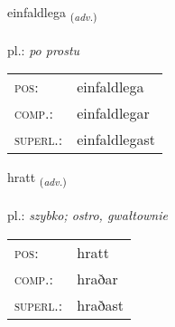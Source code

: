 \documentclass[frontgrid, backgrid]{flacards}\usepackage[]{graphicx}\usepackage[]{xcolor}
\begin{document}
\renewcommand{\flhead}{\vskip5pt \fboxsep=0pt {\small\bfseries\footnotesize Atviksorð | przysłówek}}
\renewcommand{\fcfoot}{\vskip5pt \fboxsep=0pt \hspace{2pt}{\small\bfseries\footnotesize 1K}}

\renewcommand{\blhead}{\vskip5pt {\small\bfseries\footnotesize Atviksorð | przysłówek }}
\renewcommand{\bcfoot}{\vskip5pt \hspace{2pt}{\small\bfseries\footnotesize 1K}}


{einfaldlega \small{\textsubscript{(\textit{adv.})}} \\[1ex] %
\textphonetic{[einfaltlɛɣa]} \\
pl.: \emph{po prostu} \\  [2ex]
\renewcommand*{\arraystretch}{0.8}
\begin{tabular}{ll}
\textsc{pos}: & einfaldlega \\ 
\textsc{comp.}: & einfaldlegar \\ 
\textsc{superl.}: & einfaldlegast \\
\end{tabular}
}

\renewcommand{\flhead}{\vskip5pt \fboxsep=0pt {\small\bfseries\footnotesize Atviksorð | przysłówek}}
\renewcommand{\fcfoot}{\vskip5pt \fboxsep=0pt \hspace{2pt}{\small\bfseries\footnotesize 1K}}

\renewcommand{\blhead}{\vskip5pt {\small\bfseries\footnotesize Atviksorð | przysłówek }}
\renewcommand{\bcfoot}{\vskip5pt \hspace{2pt}{\small\bfseries\footnotesize 1K}}


{hratt \small{\textsubscript{(\textit{adv.})}} \\[1ex] %
\textphonetic{[r̥aht]} \\
pl.: \emph{szybko; ostro, gwałtownie} \\  [2ex]
\renewcommand*{\arraystretch}{0.8}
\begin{tabular}{ll}
\textsc{pos}: & hratt \\ 
\textsc{comp.}: & hraðar \\ 
\textsc{superl.}: & hraðast \\
\end{tabular}
}
\end{document}
